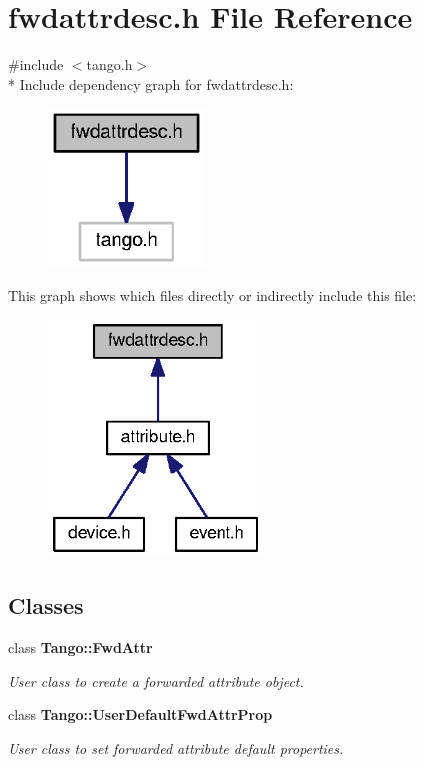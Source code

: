 \section{fwdattrdesc.\-h File Reference}
\label{fwdattrdesc_8h}
{\ttfamily \#include $<$tango.\-h$>$}\\*
Include dependency graph for fwdattrdesc.\-h\-:
\nopagebreak
\begin{figure}[H]
\begin{center}
\leavevmode
\includegraphics[width=118pt]{dd/dcf/fwdattrdesc_8h__incl}
\end{center}
\end{figure}
This graph shows which files directly or indirectly include this file\-:
\nopagebreak
\begin{figure}[H]
\begin{center}
\leavevmode
\includegraphics[width=161pt]{d8/d75/fwdattrdesc_8h__dep__incl}
\end{center}
\end{figure}
\subsection*{Classes}
\begin{DoxyCompactItemize}
\item 
class {\bf Tango\-::\-Fwd\-Attr}
\begin{DoxyCompactList}\small\item\em User class to create a forwarded attribute object. \end{DoxyCompactList}\item 
class {\bf Tango\-::\-User\-Default\-Fwd\-Attr\-Prop}
\begin{DoxyCompactList}\small\item\em User class to set forwarded attribute default properties. \end{DoxyCompactList}\end{DoxyCompactItemize}

